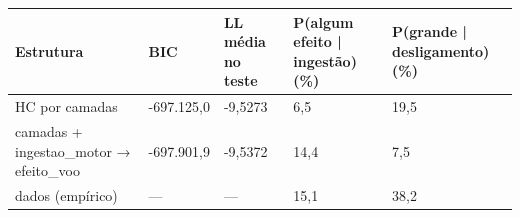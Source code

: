 \begin{tabular}{lllll}
\toprule
Estrutura & BIC & LL média no teste & P(algum efeito | ingestão) (\%) & P(grande | desligamento) (\%) \\
\midrule
HC por camadas & -697.125,0 & -9,5273 & 6,5 & 19,5 \\
camadas + ingestao\_motor → efeito\_voo & -697.901,9 & -9,5372 & 14,4 & 7,5 \\
dados (empírico) & — & — & 15,1 & 38,2 \\
\bottomrule
\end{tabular}
